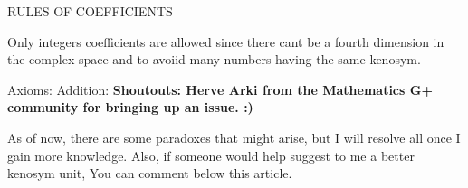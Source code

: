 \documentclass[12pt]{article}
\begin{document}
RULES OF COEFFICIENTS
\begin{flushleft}
Only integers coefficients are allowed since there cant be a fourth dimension in
the complex space and to avoiid many numbers having the same kenosym.
\end{flushleft}

Axioms:
Addition:
\textbf{Shoutouts:
Herve Arki from the Mathematics G+ community for bringing up an issue. :)}

As of now, there are some paradoxes that might arise, but I will resolve  all once I gain 
more knowledge.
Also, if someone would help suggest to me a better kenosym unit, You can comment below
this article.
\end{document}
